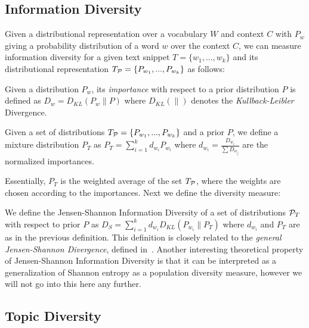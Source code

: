 \documentclass{article} %
\begin{document}

\subsection{Information Diversity}
\label{sec:information-diversity}

Given a distributional representation over a vocabulary $W$ and context $C$ with $P_w$ giving a probability distribution of a
word $w$ over the context $C$, we can measure information diversity for a given text snippet $T=\{w_1,...,w_k\}$ and its
distributional representation $T_{{\mathcal P}}=\{P_{w_1},...,P_{w_k}\}$ as follows:

\bed\label{importance}
Given a distribution $P_w$, its {\sl importance} with respect to a
prior distribution $P$ is defined as $D_w = D_{KL}(P_w\|P)$ where $D_{KL}(\|)$ denotes the
{\sl Kullback-Leibler} Divergence.
\eed

\bed\label{mixture}
Given a set of distributions $T_{{\mathcal P}}=\{P_{w_1},...,P_{w_k}\}$ and a
prior $P$, we
define a mixture distribution $P_T$ as $P_T=\sum_{i=1}^k d_{w_i} P_{w_i}$ where $d_{w_i}=\frac{D_{w_i}}{\sum D_{w_j}}$ are the normalized
importances.
\eed

Essentially, $P_T$ is the weighted average of the set $T_{{\mathcal P}}$, where
the weights are chosen according to the importances. Next we
define the diversity measure:

\bed\label{diversity}
We define the Jensen-Shannon Information Diversity of a set of
distributions ${\mathcal P}_T$ with respect to 
prior $P$ as $D_S=\sum_{i=1}^k d_{w_i}D_{KL}(P_{w_i}\|P_T)$
where $d_{w_i}$ and $P_T$ are as in the previous definition.
\eed
This definition is closely related to the 
{\em general Jensen-Shannon Divergence}, defined in~\cite{FugledeTopsoe}. Another
interesting theoretical property of Jensen-Shannon Information
Diversity is that it can be interpreted as a generalization of Shannon
entropy as a population diversity measure, however we will not go
into this here any further. 


\subsection{Topic Diversity}
\label{sec:topic-diversity}
\end{document}

